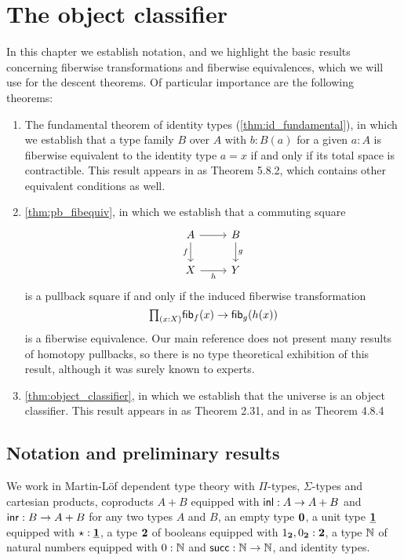 \chapter{The object classifier}

In this chapter we establish notation, and we highlight the basic results concerning fiberwise transformations and fiberwise equivalences, which we will use for the descent theorems. Of particular importance are the following theorems:
\begin{enumerate}
\item The fundamental theorem of identity types (\cref{thm:id_fundamental}), in which we establish that a type family $B$ over $A$ with $b:B(a)$ for a given $a:A$ is fiberwise equivalent to the identity type $a=x$ if and only if its total space is contractible. This result appears in \cite{hottbook} as Theorem 5.8.2, which contains other equivalent conditions as well.
\item \cref{thm:pb_fibequiv}, in which we establish that a commuting square
\begin{equation*}
\begin{tikzcd}
A \arrow[d,swap,"f"] \arrow[r] & B \arrow[d,"g"] \\
X \arrow[r,swap,"h"] & Y
\end{tikzcd}
\end{equation*}
is a pullback square if and only if the induced fiberwise transformation
\begin{equation*}
\prd{x:X} \fib{f}{x}\to\fib{g}{h(x)}
\end{equation*}
is a fiberwise equivalence. Our main reference \cite{hottbook} does not present many results of homotopy pullbacks, so there is no type theoretical exhibition of this result, although it was surely known to experts.
\item \cref{thm:object_classifier}, in which we establish that the universe is an object classifier. This result appears in \cite{rijkespitters} as Theorem 2.31, and in \cite{hottbook} as Theorem 4.8.4
\end{enumerate}

\section{Notation and preliminary results}

We work in Martin-L\"of dependent type theory with $\Pi$-types, $\Sigma$-types and cartesian products, coproducts $A+B$ equipped with ${\mathsf{inl}}:A\to A+B$ and ${\mathsf{inr}}:B\to A+B$ for any two types $A$ and $B$, an empty type $\mathbf{0}$, a unit type $\underline{\mathbf{1}}$ equipped with $\star:\underline{\mathbf{1}}$, a type $\mathbf{2}$ of booleans equipped with ${1_{\mathbf{2}}},{0_{\mathbf{2}}}:\mathbf{2}$, a type $\mathbb{N}$ of natural numbers equipped with $0:\mathbb{N}$ and $\mathsf{succ}:\mathbb{N}\to\mathbb{N}$, and identity types. 

